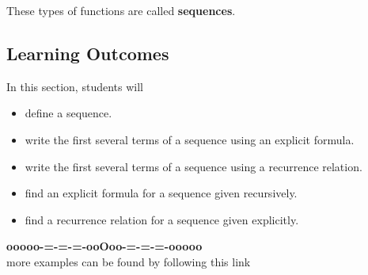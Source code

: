 \documentclass{ximera}
\begin{document}
These types of functions are called \textbf{\textcolor{purple!85!blue}{sequences}}. \\







\subsection*{Learning Outcomes}


\begin{sectionOutcomes}

In this section, students will

\begin{itemize}
\item define a sequence.
\item write the first several terms of a sequence using an explicit formula.
\item write the first several terms of a sequence using a recurrence relation.
\item find an explicit formula for a sequence given recursively.
\item find a recurrence relation for a sequence given explicitly.
\end{itemize}

\end{sectionOutcomes}















\begin{center}
\textbf{\textcolor{green!50!black}{ooooo-=-=-=-ooOoo-=-=-=-ooooo}} \\

more examples can be found by following this link\\ 

\end{center}
\end{document}
